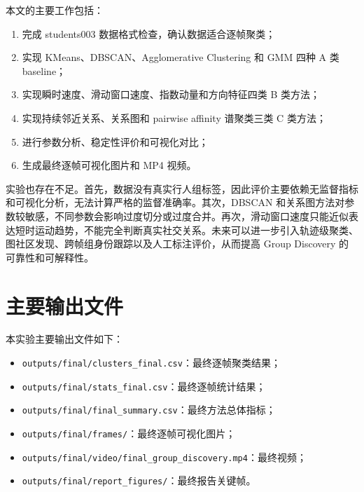 \documentclass[UTF8,a4paper,12pt]{ctexart}
\begin{document}
本文的主要工作包括：

\begin{enumerate}
    \item 完成 students003 数据格式检查，确认数据适合逐帧聚类；
    \item 实现 KMeans、DBSCAN、Agglomerative Clustering 和 GMM 四种 A 类 baseline；
    \item 实现瞬时速度、滑动窗口速度、指数动量和方向特征四类 B 类方法；
    \item 实现持续邻近关系、关系图和 pairwise affinity 谱聚类三类 C 类方法；
    \item 进行参数分析、稳定性评价和可视化对比；
    \item 生成最终逐帧可视化图片和 MP4 视频。
\end{enumerate}

实验也存在不足。首先，数据没有真实行人组标签，因此评价主要依赖无监督指标和可视化分析，无法计算严格的监督准确率。其次，DBSCAN 和关系图方法对参数较敏感，不同参数会影响过度切分或过度合并。再次，滑动窗口速度只能近似表达短时运动趋势，不能完全判断真实社交关系。未来可以进一步引入轨迹级聚类、图社区发现、跨帧组身份跟踪以及人工标注评价，从而提高 Group Discovery 的可靠性和可解释性。

\appendix

\section{主要输出文件}

本实验主要输出文件如下：

\begin{itemize}
    \item \texttt{outputs/final/clusters\_final.csv}：最终逐帧聚类结果；
    \item \texttt{outputs/final/stats\_final.csv}：最终逐帧统计结果；
    \item \texttt{outputs/final/final\_summary.csv}：最终方法总体指标；
    \item \texttt{outputs/final/frames/}：最终逐帧可视化图片；
    \item \texttt{outputs/final/video/final\_group\_discovery.mp4}：最终视频；
    \item \texttt{outputs/final/report\_figures/}：最终报告关键帧。
\end{itemize}
\end{document}
